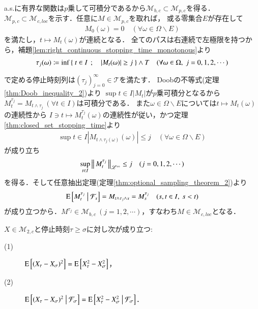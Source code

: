 	\begin{prf}
		a.s.に有界な関数は$p$乗して可積分であるから$\mathcal{M}_{b,c} \subset \mathcal{M}_{p,c}$を得る．
		$\mathcal{M}_{p,c} \subset \mathcal{M}_{c,loc}$を示す．任意に$M \in \mathcal{M}_{p,c}$を取れば，
		或る零集合$E$が存在して
		\begin{align}
			M_0(\omega) = 0 \quad (\forall \omega \in \Omega \backslash E)
		\end{align}
		を満たし，$t \longmapsto M_t(\omega)$が連続となる．
		全てのパスは右連続で左極限を持つから，補題\ref{lem:right_continuous_stopping_time_monotonous}より
		\begin{align}
			\tau_j(\omega) \coloneqq \operatorname*{inf}_{} \left\{\ t \in I\ \, ; \quad |M_t(\omega)| \geq j\ \right\} \wedge T \quad (\forall \omega \in \Omega,\ j=0,1,2,\cdots)
		\end{align}
		で定める停止時刻列は$(\tau_j)_{j=0}^{\infty} \in \mathcal{T}$を満たす．
		Doobの不等式(定理\ref{thm:Doob_inequality_2})より
		$\sup{t \in I}{|M_t|}$が$p$乗可積分となるから$M_t^{\tau_j} = M_{t \wedge \tau_j}\ (\forall t \in I)$は可積分である．
		また$\omega \in \Omega \backslash E$については$t \longmapsto M_t(\omega)$の連続性から
		$I \ni t \longmapsto M_t^{\tau_j}(\omega)$の連続性が従い，かつ定理\ref{thm:closed_set_stopping_time}より
		\begin{align}
			\sup{t \in I}{\left| M_{t \wedge \tau_j(\omega)}(\omega) \right|} \leq j
			\quad (\forall \omega \in \Omega \backslash E)
			\label{eq:M_pc_M_cloc}
		\end{align}
		が成り立ち
		\begin{align}
			\operatorname*{sup}_{t \in I} \left\|\, M_t^{\tau_j}\, \right\|_{\mathscr{L}^\infty} \leq j \quad (j=0,1,2,\cdots)
		\end{align}
		を得る．そして任意抽出定理(定理\ref{thm:optional_sampling_theorem_2})より
		\begin{align}
			\operatorname{E} \left[ M_t^{\tau_j} \ \middle|\ \mathcal{F}_s \right] = M_{t \wedge \tau_j \wedge s} = M_s^{\tau_j} \quad (s,t \in I,\ s < t)
		\end{align}
		が成り立つから．$M^{\tau_j} \in \mathcal{M}_{b,c}\ (j=1,2,\cdots)$，すなわち$M \in \mathcal{M}_{c,loc}$となる．
		\QED
	\end{prf}
	
	\begin{screen}
		\begin{lem}
			$X \in \mathcal{M}_{2,c}$と停止時刻$\tau \geq \sigma$に対し次が成り立つ:
			\begin{description}
				\item[(1)] $\operatorname{E} \left[ (X_{\tau} - X_{\sigma})^2 \right] = \operatorname{E} \left[ X_{\tau}^2 - X_{\sigma}^2 \right]$，
				\item[(2)] $\operatorname{E} \left[ (X_{\tau} - X_{\sigma})^2 \ \middle|\ \mathcal{F}_\sigma \right] = \operatorname{E} \left[ X_{\tau}^2 - X_{\sigma}^2 \ \middle|\ \mathcal{F}_\sigma \right]$．
			\end{description}
			\label{lem:stopping_time_telescopic_sum}
		\end{lem}
	\end{screen}
	
